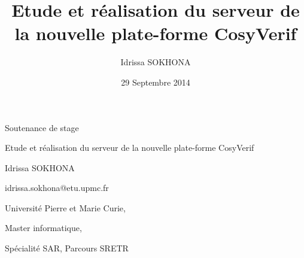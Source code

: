 \documentclass[t, english]{beamer}
\begin{document}
\title{Etude et réalisation du serveur de la nouvelle plate-forme CosyVerif}
\author{Idrissa SOKHONA}
\date{29 Septembre 2014}

\LobsterTwo

\begin{frame}
\begin{center}
\par
\textsf{Soutenance de stage}

\par
\Huge Etude et réalisation du serveur de la nouvelle plate-forme CosyVerif

\par
\normalsize
\textsf{Idrissa SOKHONA}

\par
\textsf{idrissa.sokhona@etu.upmc.fr}

\par
\textsf{Université Pierre et Marie Curie,}

\par
\textsf{Master informatique,}

\par
\textsf{Spécialité SAR, Parcours SRETR}

\end{center}
\end{frame}
\end{document}
